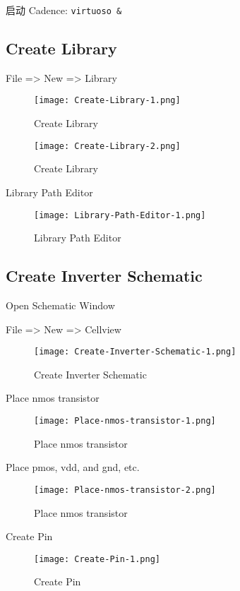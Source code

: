\documentclass{theme-2614084}
\begin{document}
启动 Cadence: \texttt{virtuoso \&}

\subsection{Create Library}

File => New => Library

\begin{figure}[H]
  \centering
  \texttt{[image: Create-Library-1.png]}
  \caption{Create Library}
\end{figure}

\begin{figure}[H]
  \centering
  \texttt{[image: Create-Library-2.png]}
  \caption{Create Library}
\end{figure}

Library Path Editor 

\begin{figure}[H]
  \centering
  \texttt{[image: Library-Path-Editor-1.png]}
  \caption{Library Path Editor}
\end{figure}

\subsection{Create Inverter Schematic}

Open Schematic Window

File => New => Cellview

\begin{figure}[H]
  \centering
  \texttt{[image: Create-Inverter-Schematic-1.png]}
  \caption{Create Inverter Schematic}
\end{figure}

Place nmos transistor

\begin{figure}[H]
  \centering
  \texttt{[image: Place-nmos-transistor-1.png]}
  \caption{Place nmos transistor}
\end{figure}

Place pmos, vdd, and gnd, etc.

\begin{figure}[H]
  \centering
  \texttt{[image: Place-nmos-transistor-2.png]}
  \caption{Place nmos transistor}
\end{figure}

Create Pin

\begin{figure}[H]
  \centering
  \texttt{[image: Create-Pin-1.png]}
  \caption{Create Pin}
\end{figure}
\end{document}
